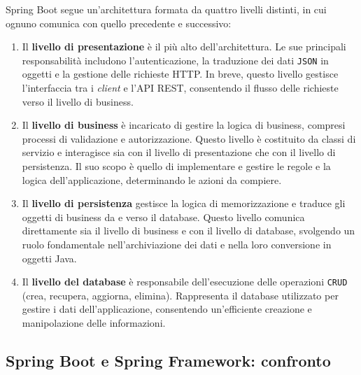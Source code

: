 Spring Boot segue un'architettura formata da quattro livelli distinti, in cui ognuno comunica con quello precedente e successivo:
\begin{enumerate}
    \item Il \textbf{livello di presentazione} è il più alto dell'architettura. Le sue principali responsabilità includono l'autenticazione, la traduzione dei dati \texttt{JSON} in oggetti e la gestione delle richieste HTTP. In breve, questo livello gestisce l'interfaccia tra i \textit{client} e l'API REST, consentendo il flusso delle richieste verso il livello di business.\cite{SPRINGBOOT_techwithmaddy}\cite{SPRINGBOOT_javatpoint}
    \item Il \textbf{livello di business} è incaricato di gestire la logica di business, compresi processi di validazione e autorizzazione. Questo livello è costituito da classi di servizio e interagisce sia con il livello di presentazione che con il livello di persistenza. Il suo scopo è quello di implementare e gestire le regole e la logica dell'applicazione, determinando le azioni da compiere.\cite{SPRINGBOOT_techwithmaddy}\cite{SPRINGBOOT_javatpoint}
    \item Il \textbf{livello di persistenza} gestisce la logica di memorizzazione e traduce gli oggetti di business da e verso il database. Questo livello comunica direttamente sia il livello di business e con il livello di database, svolgendo un ruolo fondamentale nell'archiviazione dei dati e nella loro conversione in oggetti Java.\cite{SPRINGBOOT_techwithmaddy}\cite{SPRINGBOOT_javatpoint}
    \item Il \textbf{livello del database} è responsabile dell'esecuzione delle operazioni \texttt{CRUD} (crea, recupera, aggiorna, elimina). Rappresenta il database utilizzato per gestire i dati dell'applicazione, consentendo un’efficiente creazione e manipolazione delle informazioni.\cite{SPRINGBOOT_techwithmaddy}\cite{SPRINGBOOT_javatpoint}
\end{enumerate}


\subsection{Spring Boot e Spring Framework: confronto}

